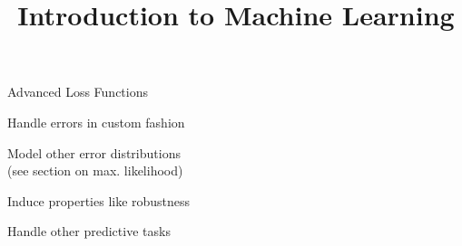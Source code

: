 \documentclass[11pt,compress,t,notes=noshow, xcolor=table]{beamer}
\title{Introduction to Machine Learning}
\begin{document}
    

\begin{framei}[sep=M]{Advanced Loss Functions }

\item Handle errors in custom fashion
\item Model other error distributions\\
(see section on max. likelihood)
\item Induce properties like robustness
\item Handle other predictive tasks

\vfill



\end{framei}
\end{document}
